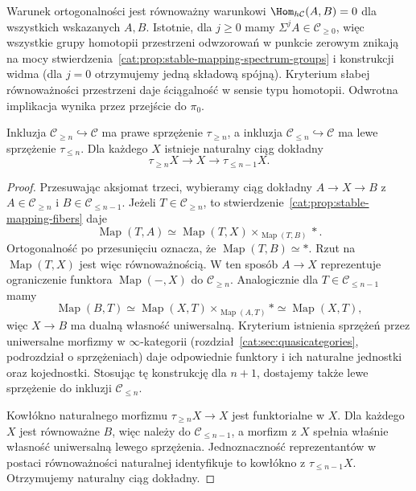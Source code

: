 Warunek ortogonalności jest równoważny warunkowi $\Hom_{h\mathcal C}(A,B)=0$ dla wszystkich wskazanych $A,B$. Istotnie, dla $j\geq0$ mamy $\Sigma^j A\in\mathcal C_{\geq0}$, więc wszystkie grupy homotopii przestrzeni odwzorowań w punkcie zerowym znikają na mocy stwierdzenia~\ref{cat:prop:stable-mapping-spectrum-groups} i konstrukcji widma (dla $j=0$ otrzymujemy jedną składową spójną). Kryterium słabej równoważności przestrzeni daje ściągalność w sensie typu homotopii. Odwrotna implikacja wynika przez przejście do $\pi_0$.

\begin{twierdzenie}\label{cat:thm:stable-truncation-adjunctions}
Inkluzja $\mathcal C_{\geq n}\hookrightarrow\mathcal C$ ma prawe sprzężenie $\tau_{\geq n}$, a inkluzja $\mathcal C_{\leq n}\hookrightarrow\mathcal C$ ma lewe sprzężenie $\tau_{\leq n}$. Dla każdego $X$ istnieje naturalny ciąg dokładny
\[
 \tau_{\geq n}X\longrightarrow X\longrightarrow\tau_{\leq n-1}X.
\]
\end{twierdzenie}
\begin{proof}
Przesuwając aksjomat trzeci, wybieramy ciąg dokładny $A\to X\to B$ z $A\in\mathcal C_{\geq n}$ i $B\in\mathcal C_{\leq n-1}$. Jeżeli $T\in\mathcal C_{\geq n}$, to stwierdzenie~\ref{cat:prop:stable-mapping-fibers} daje
\[
 \operatorname{Map}(T,A)\simeq
 \operatorname{Map}(T,X)\times_{\operatorname{Map}(T,B)}*.
\]
Ortogonalność po przesunięciu oznacza, że $\operatorname{Map}(T,B)\simeq *$. Rzut na $\operatorname{Map}(T,X)$ jest więc równoważnością. W ten sposób $A\to X$ reprezentuje ograniczenie funktora $\operatorname{Map}(-,X)$ do $\mathcal C_{\geq n}$. Analogicznie dla $T\in\mathcal C_{\leq n-1}$ mamy
\[
 \operatorname{Map}(B,T)\simeq
 \operatorname{Map}(X,T)\times_{\operatorname{Map}(A,T)}*
 \simeq\operatorname{Map}(X,T),
\]
więc $X\to B$ ma dualną własność uniwersalną. Kryterium istnienia sprzężeń przez uniwersalne morfizmy w $\infty$-kategorii (rozdział~\ref{cat:sec:quasicategories}, podrozdział o sprzężeniach) daje odpowiednie funktory i ich naturalne jednostki oraz kojednostki. Stosując tę konstrukcję dla $n+1$, dostajemy także lewe sprzężenie do inkluzji $\mathcal C_{\leq n}$.

Kowłókno naturalnego morfizmu $\tau_{\geq n}X\to X$ jest funktorialne w $X$. Dla każdego $X$ jest równoważne $B$, więc należy do $\mathcal C_{\leq n-1}$, a morfizm z $X$ spełnia właśnie własność uniwersalną lewego sprzężenia. Jednoznaczność reprezentantów w postaci równoważności naturalnej identyfikuje to kowłókno z $\tau_{\leq n-1}X$. Otrzymujemy naturalny ciąg dokładny.
\end{proof}

